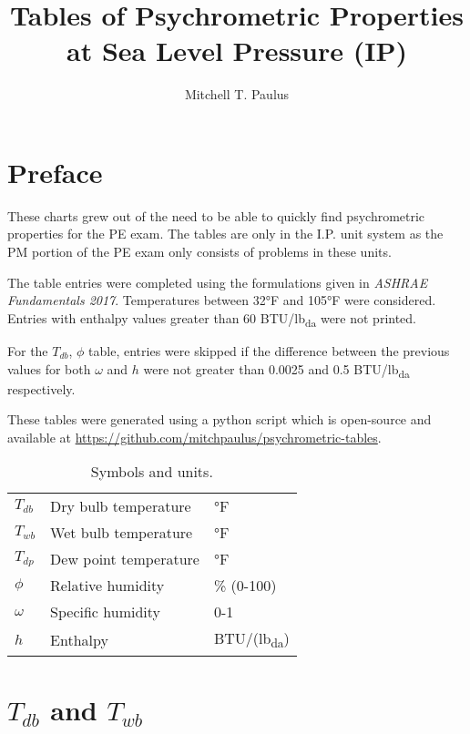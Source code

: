 \documentclass{book}
\title{Tables of Psychrometric Properties at Sea Level Pressure (IP)}
\author{Mitchell T. Paulus}
\newcommand{\tdb}{\(T_{db}\)}
\newcommand{\twb}{\(T_{wb}\)}
\newcommand{\tdp}{\(T_{dp}\)}
\newcommand{\rh}{\(\phi\)}
\newcommand{\spechum}{\(\omega\)}
\newcommand{\enthalpy}{\(h\)}
\begin{document}
\maketitle{}

\tableofcontents{}

\chapter{Preface}

These charts grew out of the need to be able to quickly find
psychrometric properties for the PE exam. The tables are only in the
I.P. unit system as the PM portion of the PE exam only consists of
problems in these units.

The table entries were completed using the formulations given in
\textit{ASHRAE Fundamentals 2017}. Temperatures between 32°F and 105°F
were considered. Entries with enthalpy values greater than 60
BTU/lb\textsubscript{da}
were not printed.

For the \tdb{}, \rh{} table, entries were skipped if the difference
between the previous values for both \spechum{} and \enthalpy{} were not
greater than 0.0025 and 0.5 BTU/lb\textsubscript{da} respectively.

These tables were generated using a python script which is open-source
and available at \url{https://github.com/mitchpaulus/psychrometric-tables}.

\begin{table}
\centering
\caption{Symbols and units.}
\label{tab:}
\begin{tabular}{lll}
\toprule
    \tdb & Dry bulb temperature & °F \\
    \twb & Wet bulb temperature & °F \\
    \tdp & Dew point temperature & °F \\
    \rh & Relative humidity & \% (0-100) \\
    \spechum & Specific humidity & 0-1 \\
    \enthalpy & Enthalpy & BTU/(lb\textsubscript{da}) \\
\end{tabular}

\end{table}

\chapter{\(T_{db}\) and \(T_{wb}\) }

\newpage
{
\small



}
\end{document}
